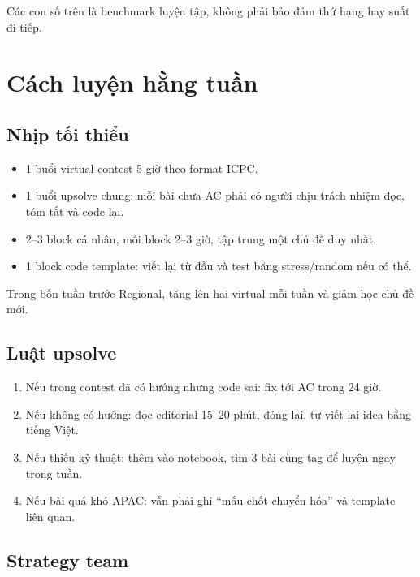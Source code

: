\documentclass[11pt,a4paper]{article}
\begin{document}
Các con số trên là benchmark luyện tập, không phải bảo đảm thứ hạng hay suất đi tiếp.

\section{Cách luyện hằng tuần}

\subsection{Nhịp tối thiểu}

\begin{itemize}
  \item 1 buổi virtual contest 5 giờ theo format ICPC.
  \item 1 buổi upsolve chung: mỗi bài chưa AC phải có người chịu trách nhiệm đọc, tóm tắt và code lại.
  \item 2--3 block cá nhân, mỗi block 2--3 giờ, tập trung một chủ đề duy nhất.
  \item 1 block code template: viết lại từ đầu và test bằng stress/random nếu có thể.
\end{itemize}

Trong bốn tuần trước Regional, tăng lên hai virtual mỗi tuần và giảm học chủ đề mới.

\subsection{Luật upsolve}

\begin{enumerate}
  \item Nếu trong contest đã có hướng nhưng code sai: fix tới AC trong 24 giờ.
  \item Nếu không có hướng: đọc editorial 15--20 phút, đóng lại, tự viết lại idea bằng tiếng Việt.
  \item Nếu thiếu kỹ thuật: thêm vào notebook, tìm 3 bài cùng tag để luyện ngay trong tuần.
  \item Nếu bài quá khó APAC: vẫn phải ghi ``mấu chốt chuyển hóa'' và template liên quan.
\end{enumerate}

\subsection{Strategy team}
\end{document}
